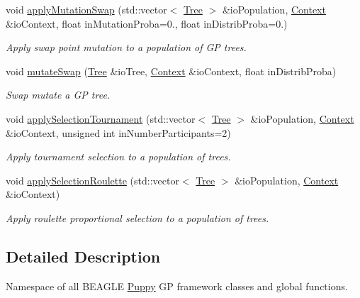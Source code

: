\begin{DoxyCompactItemize}
void \hyperlink{group__Puppy_ga5c961ca57a2b983b762d9b1733642cf0}{apply\+Mutation\+Swap} (std\+::vector$<$ \hyperlink{classPuppy_1_1Tree}{Tree} $>$ \&io\+Population, \hyperlink{classPuppy_1_1Context}{Context} \&io\+Context, float in\+Mutation\+Proba=0., float in\+Distrib\+Proba=0.)
\begin{DoxyCompactList}\small\item\em Apply swap point mutation to a population of G\+P trees. \end{DoxyCompactList}\item 
void \hyperlink{group__Puppy_gab2879a2766d6a1dc22304f39d502656f}{mutate\+Swap} (\hyperlink{classPuppy_1_1Tree}{Tree} \&io\+Tree, \hyperlink{classPuppy_1_1Context}{Context} \&io\+Context, float in\+Distrib\+Proba)
\begin{DoxyCompactList}\small\item\em Swap mutate a G\+P tree. \end{DoxyCompactList}\item 
void \hyperlink{group__Puppy_gaf6abed44ba1d792876575211a238e317}{apply\+Selection\+Tournament} (std\+::vector$<$ \hyperlink{classPuppy_1_1Tree}{Tree} $>$ \&io\+Population, \hyperlink{classPuppy_1_1Context}{Context} \&io\+Context, unsigned int in\+Number\+Participants=2)
\begin{DoxyCompactList}\small\item\em Apply tournament selection to a population of trees. \end{DoxyCompactList}\item 
void \hyperlink{group__Puppy_gacdee177409bac54392b16bc8ba2f630b}{apply\+Selection\+Roulette} (std\+::vector$<$ \hyperlink{classPuppy_1_1Tree}{Tree} $>$ \&io\+Population, \hyperlink{classPuppy_1_1Context}{Context} \&io\+Context)
\begin{DoxyCompactList}\small\item\em Apply roulette proportional selection to a population of trees. \end{DoxyCompactList}\end{DoxyCompactItemize}


\subsection{Detailed Description}
Namespace of all B\+E\+A\+G\+L\+E \hyperlink{namespacePuppy}{Puppy} G\+P framework classes and global functions. 